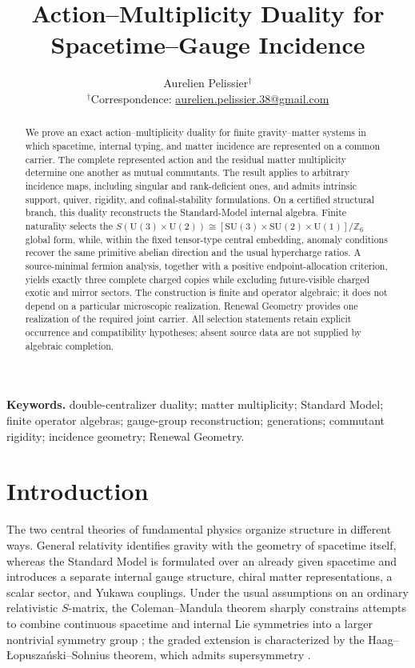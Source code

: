 \documentclass[11pt]{article}
\title{\textbf{Action--Multiplicity Duality for Spacetime--Gauge Incidence}}
\author{Aurelien Pelissier$^{\dagger}$\\
{\small $^{\dagger}$Correspondence: \href{mailto:aurelien.pelissier.38@gmail.com}{aurelien.pelissier.38@gmail.com}}}
\date{}
\numberwithin{equation}{section}
\theoremstyle{definition}
\theoremstyle{remark}
\newcommand{\Z}{\mathbb Z}
\newcommand{\U}{\mathrm U}
\newcommand{\SU}{\mathrm{SU}}
\begin{document}
\maketitle


\begin{abstract}
We prove an exact action--multiplicity duality for finite gravity--matter systems in which spacetime, internal typing, and matter incidence are represented on a common carrier. The complete represented action and the residual matter multiplicity determine one another as mutual commutants. The result applies to arbitrary incidence maps, including singular and rank-deficient ones, and admits intrinsic support, quiver, rigidity, and cofinal-stability formulations.
%
On a certified structural branch, this duality reconstructs the Standard-Model internal algebra. Finite naturality selects the $S(\U(3)\times\U(2))\cong[\SU(3)\times\SU(2)\times\U(1)]/\Z_6$ global form, while, within the fixed tensor-type central embedding, anomaly conditions recover the same primitive abelian direction and the usual hypercharge ratios. A source-minimal fermion analysis, together with a positive endpoint-allocation criterion, yields exactly three complete charged copies while excluding future-visible charged exotic and mirror sectors. The construction is finite and operator algebraic; it does not depend on a particular microscopic realization. Renewal Geometry provides one realization of the required joint carrier.
All selection statements retain explicit occurrence and compatibility hypotheses; absent source data are not supplied by algebraic completion.
\end{abstract}


\medskip
\noindent\textbf{Keywords.}
double-centralizer duality; matter multiplicity; Standard Model;
finite operator algebras; gauge-group reconstruction; generations;
commutant rigidity; incidence geometry; Renewal Geometry.


\section{Introduction}
\label{sec:introduction}
The two central theories of fundamental physics organize structure in
different ways.  General relativity identifies gravity with the geometry of
spacetime itself, whereas the Standard Model is formulated over an already
given spacetime and introduces a separate internal gauge structure, chiral
matter representations, a scalar sector, and Yukawa couplings.  Under the
usual assumptions on an ordinary relativistic $S$-matrix, the
Coleman--Mandula theorem sharply constrains attempts to combine continuous
spacetime and internal Lie symmetries into a larger nontrivial symmetry group
\cite{ColemanMandula1967}; the graded extension is characterized by the
Haag--\L opusza\'nski--Sohnius theorem, which admits supersymmetry
\cite{HaagLopuszanskiSohnius1975}.
\end{document}
